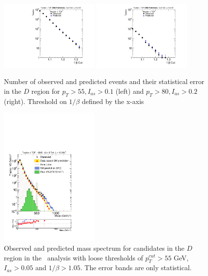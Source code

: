 \begin{figure}
\begin{center}
\includegraphics[clip=true, trim=0.0cm 0cm 3.0cm 0cm, width=0.44\textwidth]{figures/tkmu/Pred_I010_Pt55_Data8TeV}
\includegraphics[clip=true, trim=0.0cm 0cm 3.0cm 0cm, width=0.44\textwidth]{figures/tkmu/Pred_I020_Pt80_Data8TeV}
\caption{Number of observed and predicted events and their statistical error in the $D$ region for $p_T>55, I_{as}>0.1$ (left)
and $p_T>80, I_{as}>0.2$ (right). Threshold on $1/\beta$ defined by the x-axis
\label{fig:PredTkTOF}}
\end{center}
\end{figure}

\begin{figure}
 \begin{center}
  \includegraphics[clip=true, trim=0.0cm 0cm 2.8cm 0cm,width=0.44\textwidth]{figures/tkmu/Rescale_Mass_8TeV_Loose}
 \end{center}
 \caption{Observed and predicted mass spectrum for candidates in the $D$ region in the \tktof\ analysis with loose thresholds of 
$p_T^{cut}>55$ GeV, $I_{as}>0.05$ and $1/\beta>1.05$.
The error bands are only statistical.
\label{fig:MassDistribution}}
\end{figure}

